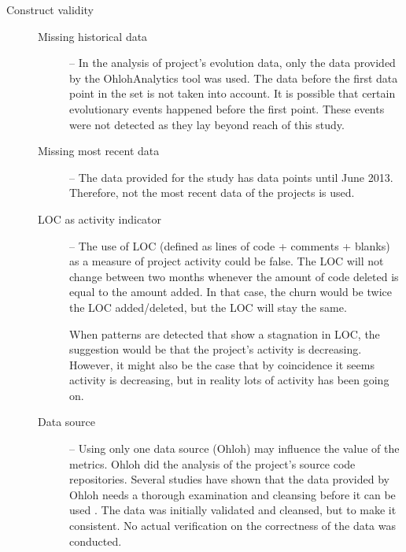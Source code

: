 \begin{description}
	\item[Construct validity] \hfill
	
	\begin{description}
		\item[\rm{Missing historical data}] -- In the analysis of project's
			evolution data, only the data provided by the OhlohAnalytics tool
			\cite{ohlohanalytics, bruntink2013} was used.
			The data before the first data point in the set is not taken into account. It
			is possible that certain evolutionary events happened before the first point.
			These events were not detected as they lay beyond reach of this study.

		\item[\rm{Missing most recent data}] -- The data provided for the study has
			data points until June 2013. Therefore, not the most recent data of the
			projects is used.

		\item[\rm{LOC as activity indicator}] -- The use of LOC (defined as
			lines of code + comments + blanks) as a measure of project activity could be
			false. The LOC will not change between two months whenever the amount of code
			deleted is equal to the amount added. In that case, the churn would be twice
			the LOC added/deleted, but the LOC will stay the same.

			When patterns are detected that show a stagnation in LOC, the suggestion
			would be that the project's activity is decreasing. However, it might also
			be the case that by coincidence it seems activity is decreasing, but in
			reality lots of activity has been going on.

		\item[\rm{Data source}] -- Using only one data source (Ohloh) may
			influence the value of the metrics. Ohloh did the analysis of the project's
			source code repositories. Several studies have shown that the data provided
			by Ohloh needs a thorough examination and cleansing before it can be used
			\cite{bruntink2013, ohlohanalytics, bruntink2014}. The data was initially
			validated and cleansed, but to make it consistent. No actual verification on
			the correctness of the data was conducted.

	\begin{comment}
			Additionally, the data set of projects is a sample taken from all projects
			tracked by Ohloh. What is unclear is if the set of projects tracked by Ohloh
			is a representation of the world of OSS projects. Selecting a data set that
			is representative to the projects tracked by Ohloh does not automatically be
			representative to the world.


\end{comment}
\end{description}
\end{description}

